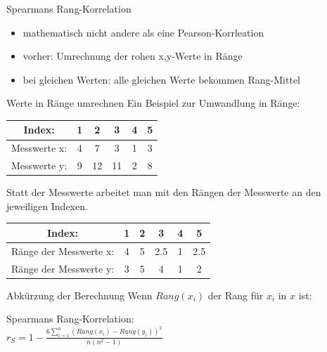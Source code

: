 \begin{frame}
  {Spearmans Rang-Korrelation}
  \begin{itemize}[<+->]
    \item mathematisch \alert{nicht andere als eine Pearson-Korrleation}
    \item vorher: Umrechnung der rohen x,y-Werte in \alert{Ränge}
    \item bei gleichen Werten: \alert{alle gleichen Werte bekommen Rang-Mittel}
  \end{itemize}
\end{frame}

\begin{frame}
  {Werte in Ränge umrechnen}
  Ein Beispiel zur Umwandlung in Ränge:
  \begin{center}
    \begin{tabular}[h!]{|c||c|c|c|c|c|}
      \hline
      Index: & 1 & 2 & 3 & 4 & 5 \\
      \hline
      \hline
      Messwerte x:& 4 & 7 & 3 & 1 & 3 \\
      \hline
      Messwerte y: & 9 & 12 & 11 & 2 & 8 \\
      \hline
    \end{tabular}
  \end{center}
  Statt der Messwerte arbeitet man mit den Rängen der Messwerte an den jeweiligen Indexen.
  \begin{center}
    \begin{tabular}[h!]{|c||c|c|c|c|c|}
      \hline
      Index: & 1 & 2 & 3 & 4 & 5 \\
      \hline
      \hline
      Ränge der Messwerte x:& 4 & 5 & 2.5 & 1 & 2.5 \\
      \hline
      Ränge der Messwerte y: & 3 & 5 & 4 & 1 & 2 \\
      \hline
    \end{tabular}
  \end{center}
\end{frame}

\begin{frame}
  {Abkürzung der Berechnung}
  Wenn $Rang(x_i)$ der Rang für $x_i$ in $x$ ist:\\
  \vspace{0.5cm}
  \begin{center}
    Spearmans Rang-Korrelation:\\[2ex]
    \alert{$r_{S}=1-\frac{6\sum\limits_{i=1}^n(Rang(x_i)-Rang(y_i))^2}{n(n^2-1)}$}
  \end{center}
\end{frame}

